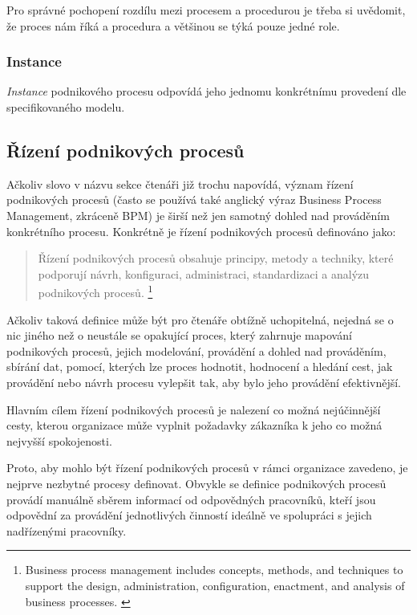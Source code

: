 Pro správné pochopení rozdílu mezi procesem a procedurou je třeba si uvědomit, že proces nám říká  a procedura  a většinou se týká pouze jedné role. \cite{Bandor2007}

\subsubsection{Instance}
\textit{Instance} podnikového procesu odpovídá jeho jednomu konkrétnímu provedení dle specifikovaného modelu.

\subsection{Řízení podnikových procesů}
Ačkoliv slovo  v názvu sekce čtenáři již trochu napovídá, význam řízení podnikových procesů  (často se používá také anglický výraz Business Process Management, zkráceně BPM) je širší než jen samotný dohled nad prováděním konkrétního procesu. Konkrétně je řízení podnikových procesů definováno jako: \cite{Weske2007}

\begin{quote}
Řízení podnikových procesů obsahuje principy, metody a techniky, které podporují návrh, konfiguraci, administraci, standardizaci a analýzu podnikových procesů.
\footnote{Business process management includes concepts, methods, and techniques to support the design, administration, configuration, enactment, and analysis of business processes. \cite{Weske2007}}
\end{quote}

Ačkoliv taková definice může být pro čtenáře obtížně uchopitelná, nejedná se o nic jiného než o neustále se opakující proces, který zahrnuje mapování podnikových procesů, jejich modelování, provádění a dohled nad prováděním, sbírání dat, pomocí, kterých lze proces hodnotit, hodnocení a hledání cest, jak provádění nebo návrh procesu vylepšit tak, aby bylo jeho provádění efektivnější.

Hlavním cílem řízení podnikových procesů je nalezení co možná nejúčinnější cesty, kterou organizace může vyplnit požadavky zákazníka k jeho co možná nejvyšší spokojenosti. \cite{Jedlitschka2010}

Proto, aby mohlo být řízení podnikových procesů v rámci organizace zavedeno, je nejprve nezbytné procesy definovat. Obvykle se definice podnikových procesů provádí manuálně sběrem informací od odpovědných pracovníků, kteří jsou odpovědní za provádění jednotlivých činností ideálně ve spolupráci s jejich nadřízenými pracovníky.

